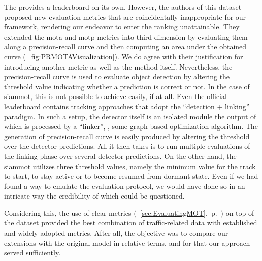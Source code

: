 The \uadetrac{} provides a leaderboard on its own. However, the authors of this dataset proposed new evaluation metrics that are coincidentally inappropriate for our framework, rendering our endeavor to enter the ranking unattainable. They extended the \gls{mota} and \gls{motp} metrics into third dimension by evaluating them along a precision-recall curve and then computing an area under the obtained curve (\figtext{}~\ref{fig:PRMOTAVisualization}). We do agree with their justification for introducing another metric as well as the method itself. Nevertheless, the precision-recall curve is used to evaluate object detection by altering the threshold value indicating whether a prediction is correct or not. In the case of \gls{siammot}, this is not possible to achieve easily, if at all. Even the official \uadetrac{} leaderboard contains tracking approaches that adopt the ``detection + linking'' paradigm. In such a setup, the detector itself is an isolated module the output of which is processed by a ``linker'', \egtext{}, some graph-based optimization algorithm. The generation of precision-recall curve is easily produced by altering the threshold over the detector predictions. All it then takes is to run multiple evaluations of the linking phase over several detector predictions. On the other hand, the \gls{siammot} utilizes three threshold values, namely the minimum value for the track to start, to stay active or to become resumed from dormant state. Even if we had found a way to emulate the evaluation protocol, we would have done so in an intricate way the credibility of which could be questioned.

Considering this, the use of \gls{clear} metrics (\sectiontext{}~\ref{sec:EvaluatingMOT},~p.~\pageref{sec:EvaluatingMOT}) on top of the \uadetrac{} dataset provided the best combination of traffic-related data with established and widely adopted metrics. After all, the objective was to compare our extensions with the original model in relative terms, and for that our approach served sufficiently.
